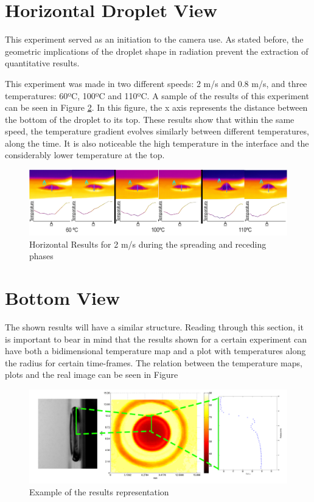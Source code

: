 
\section{Horizontal Droplet View}

\par This experiment served as an initiation to the camera use. As stated before, the geometric implications of the droplet shape in radiation prevent the extraction of quantitative results.\\
\par This experiment was made in two different speeds: 2 m/s and 0.8 m/s, and three temperatures: 60ºC, 100ºC and 110ºC. A sample of the results of this experiment can be seen in Figure \ref{fig:hexp}. In this figure, the x axis represents the distance between the bottom of the droplet to its top. These results show that within the same speed, the temperature gradient evolves similarly between different temperatures, along the time. It is also noticeable the high temperature in the interface and the considerably lower temperature at the top.

\begin{figure}[h]
\includegraphics[width=1\linewidth]{Figures/5.Chapter/hexp.png}
\caption{Horizontal Results for 2 m/s during the spreading and receding phases}
\label{fig:hexp}
\end{figure}

\section{Bottom View}

\par The shown results will have a similar structure. Reading through this section, it is important to bear in mind that the results shown for a certain experiment can have both a bidimensional temperature map and a plot with temperatures along the radius for certain time-frames. The relation between the temperature maps, plots and the real image can be seen in Figure 

\begin{figure}[h]
\includegraphics[width=1\linewidth]{Figures/5.Chapter/example.png}
\caption{Example of the results representation}
\label{fig:hexp}
\end{figure}

